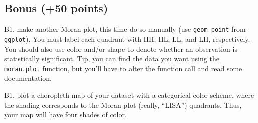 \documentclass[]{article}
\begin{document}
\hypertarget{bonus-50-points}{%
\subsection{Bonus (+50 points)}\label{bonus-50-points}}

B1. make another Moran plot, this time do so manually (use
\texttt{geom\_point} from \texttt{ggplot}). You must label each quadrant
with HH, HL, LL, and LH, respectively. You should also use color and/or
shape to denote whether an observation is statistically significant.
Tip, you can find the data you want using the \texttt{moran.plot}
function, but you'll have to alter the function call and read some
documentation.

B1. plot a choropleth map of your dataset with a categorical color
scheme, where the shading corresponds to the Moran plot (really,
``LISA'') quadrants. Thus, your map will have four shades of color.
\end{document}
